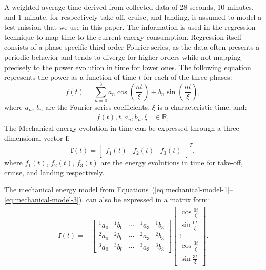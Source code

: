 A weighted average time derived from collected data of 28 seconds, 10 minutes, and 1 minute, for respectively take-off, cruise, and landing, is assumed to model a test mission that we use in this paper. The information is used in the regression technique to map time to the current energy consumption. Regression itself consists of a phase-specific third-order Fourier series, as the data often presents a periodic behavior and tends to diverge for higher orders while not mapping precisely to the power evolution in time for lower ones. The following equation represents the power as a function of time $t$ for each of the three phases:
\begin{equation}\label{eq:mechanical-model-1}
  f(t)=\sum_{n=0}^{3}{a_n\cos{\left(\frac{nt}{\xi}\right)} + b_n\sin{\left(\frac{nt}{\xi}\right)}},
\end{equation}
where $a_n$, $b_n$ are the Fourier series coefficients,  $\xi$ is a characteristic time, and:
\begin{equation}\label{eq:mechanical-model-2}
  \begin{split}
    f(t),t,a_n,b_n,\xi&\in\mathbb{R},
  \end{split}
\end{equation}
The Mechanical energy evolution in time can be expressed through a three-dimensional vector $\mathbf{f}$:
\begin{equation}\label{eq:mechanical-model-3}
  \mathbf{f}(t)=
  \begin{bmatrix}
    f_1(t)& f_2(t)& f_3(t)
  \end{bmatrix}^T,
\end{equation}
where $f_1(t)$, $f_2(t)$, $f_3(t)$ are the energy evolutions in time for take-off, cruise, and landing respectively.

The mechanical energy model from Equations~(\ref{eq:mechanical-model-1}--\ref{eq:mechanical-model-3}), can also be expressed in a matrix form:
\begin{equation}\label{eq:mechanical-model-4}
    \begin{split}
    \mathbf{f}(t)=&
    \begin{bmatrix}
      {}^1a_0 & {}^1b_0 & \cdots & {}^1a_3 & {}^1b_3 \\
      {}^2a_0 & {}^2b_0 & \cdots & {}^2a_3 & {}^2b_3 \\
      {}^3a_0 & {}^3b_0 & \cdots & {}^3a_3 & {}^3b_3
    \end{bmatrix}
    \begin{bmatrix}
      \cos\frac{0t}{\xi} \\ \sin\frac{0t}{\xi} \\ \vdots \\ \cos\frac{3t}{\xi} \\  \sin\frac{3t}{\xi}
    \end{bmatrix}.
  \end{split}
\end{equation}

